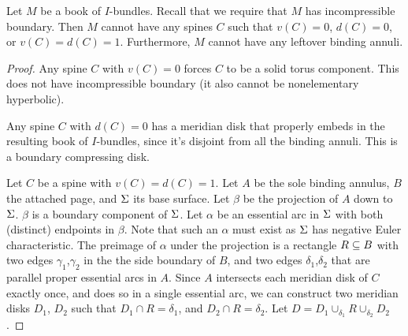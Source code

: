 \begin{prop}\label{P:1ptcap}

Let $M$ be a book of $I$-bundles. Recall that we require that $M$ has
incompressible boundary. Then $M$ cannot have any spines $C$ such that
$v(C)=0$, $d(C)=0$, or $v(C)=d(C)=1$. Furthermore, $M$ cannot have any leftover
binding annuli.

\end{prop}

\begin{proof}

Any spine $C$ with $v(C)=0$ forces $C$ to be a solid torus component. This does
not have incompressible boundary (it also cannot be nonelementary hyperbolic).

Any spine $C$ with $d(C)=0$ has a meridian disk that properly embeds in the
resulting book of $I$-bundles, since it's disjoint from all the binding annuli.
This is a boundary compressing disk.


Let $C$ be a spine with $v(C)=d(C)=1$. Let $A$ be the sole binding annulus, $B$
the attached page, and $\Sigma$ its base surface. Let $\beta$ be the projection of
$A$ down to $\Sigma$. $\beta$ is a boundary component of $\Sigma$. Let $\alpha$ be an
essential arc in $\Sigma$ with both (distinct) endpoints in $\beta$. Note that
such an $\alpha$ must exist as $\Sigma$ has negative Euler characteristic. The
preimage of $\alpha$ under the projection is a rectangle $R \subseteq B$ with two
edges $\gamma_1$,$\gamma_2$ in the the side boundary of $B$, and two edges
$\delta_1$,$\delta_2$ that are parallel proper essential arcs in $A$.  Since
$A$ intersects each meridian disk of $C$ exactly once, and does so in a single
essential arc, we can construct two meridian disks $D_1$, $D_2$ such that $D_1
\cap R = \delta_1$, and $D_2 \cap R = \delta_2$.  Let $D = D_1 \cup_{\delta_1}
R \cup_{\delta_2} D_2$.


\end{proof}
